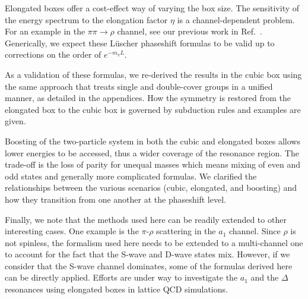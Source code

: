 \documentclass[aps,prd,reprint,showpacs,floatfix,longbibliography,,superscriptaddress]{revtex4-1}
\begin{document}
\begin{widetext}
Elongated boxes offer a cost-effect way of varying the box size. 
The sensitivity of the energy spectrum to the elongation factor $\eta$  is a channel-dependent problem. For an example in 
the $\pi\pi\rightarrow \rho$ channel, see our previous work in Ref.~\cite{Guo:2016zos}. Generically, we expect these L\"{u}scher phaseshift formulas to be valid up to corrections on the order of $e^{-m_\pi L}$. 

As a validation of these formulas, we re-derived the results in the cubic box using the same approach that treats single and double-cover groups in a unified manner, as detailed in the appendices. How the symmetry is restored from the elongated box to the cubic box is governed by subduction rules and examples are given.

Boosting of the two-particle system in both the cubic and elongated boxes allows lower energies to be accessed, thus a wider coverage of the resonance region. 
The trade-off is the loss of parity for unequal masses which means mixing of even and odd states and generally more complicated formulas. We clarified the relationships between the various scenarios (cubic, elongated, and boosting) 
and how they transition from one another at the phaseshift level.

Finally, we note that the methods used here can be readily extended to other interesting cases.
One example is the $\pi$-$\rho$ scattering in the $a_1$ channel. Since $\rho$ is not
spinless, the formalism used here needs to be extended to a multi-channel one to account for the fact that the
S-wave and D-wave states mix. However, if we consider that the S-wave
channel dominates, some of the formulas derived here can be directly applied.
Efforts are under way to investigate the $a_1$ and 
the $\Delta $ resonances using elongated boxes in lattice QCD simulations.



\end{widetext}
\end{document}
